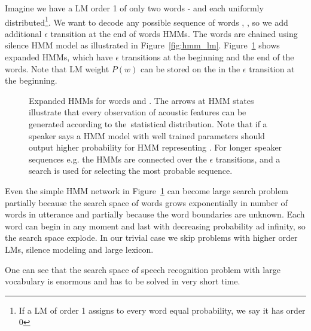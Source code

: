 {Imagine we have a \ac{LM} order 1 of only two words -  and  each uniformly distributed\footnote{If a \ac{LM} of order 1 assigns to every word equal probability, we say it has order 0}.
We want to decode any possible sequence of words , , so we add additional $\epsilon$ transition at the end of words \acp{HMM}. 
The words are chained using silence \ac{HMM} model as illustrated in Figure~\ref{fig:hmm_lm}.
Figure~\ref{fig:hmm_alt} shows expanded \acp{HMM}, which have $\epsilon$ transitions at the beginning and the end of the words. 
Note that \ac{LM} weight $P(w)$ can be stored on the in the $\epsilon$ transition at the beginning.
\begin{figure}[!htp]
    \begin{center}
        
        \caption{Expanded \acp{HMM} for words  and . 
        The arrows at \ac{HMM} states illustrate that every observation of acoustic features 
        can be generated according to the~statistical distribution. 
        Note that if a speaker says  a \ac{HMM} model with well trained parameters should output higher probability
        for \ac{HMM} representing . For longer speaker sequences e.g.  the \acp{HMM} are connected over the 
$\epsilon$ transitions, and a search is used for selecting the most probable sequence.}
        \label{fig:hmm_alt} 
    \end{center}
\end{figure}

Even the simple \ac{HMM} network in Figure~\ref{fig:hmm_alt} can become large search problem partially because the search space of words grows exponentially in number of words in utterance and partially because the word boundaries are unknown. 
Each word can begin in any moment and last with decreasing probability ad infinity, so the search space explode.
In our trivial case we skip problems with higher order \acp{LM}, silence modeling and large lexicon.

One can see that the search space of speech recognition problem with large vocabulary is enormous and has to be solved in very short time.

}
